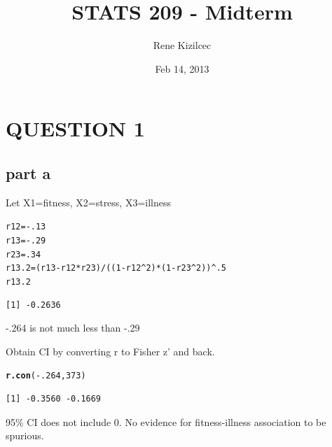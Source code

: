 \documentclass{article}\usepackage{graphicx, color}
\title{STATS 209 - Midterm}
\author{Rene Kizilcec}
\date{Feb 14, 2013}
\makeatletter
\newcommand{\hlfunctioncall}[1]{\textcolor[rgb]{0.501960784313725,0,0.329411764705882}{\textbf{#1}}}%
\newenvironment{kframe}{%
 \def\at@end@of@kframe{}%
 \ifinner\ifhmode%
  \def\at@end@of@kframe{\end{minipage}}%
  \begin{minipage}{\columnwidth}%
 \fi\fi%
 \def\FrameCommand##1{\hskip\@totalleftmargin \hskip-\fboxsep
 \colorbox{shadecolor}{##1}\hskip-\fboxsep
     \hskip-\linewidth \hskip-\@totalleftmargin \hskip\columnwidth}%
 \MakeFramed {\advance\hsize-\width
   \@totalleftmargin\z@ \linewidth\hsize
   \@setminipage}}%
 {\par\unskip\endMakeFramed%
 \at@end@of@kframe}
\newenvironment{knitrout}{}{} %
\makeatother
\begin{document}
\maketitle 







\section*{QUESTION 1}
\subsection*{part a}
Let X1=fitness, X2=stress, X3=illness
\begin{knitrout}
\color{fgcolor}\begin{kframe}
\begin{alltt}
r12=-.13
r13=-.29
r23=.34
r13.2=(r13-r12*r23)/((1-r12^2)*(1-r23^2))^.5
r13.2
\end{alltt}
\begin{verbatim}
[1] -0.2636
\end{verbatim}
\end{kframe}
\end{knitrout}

-.264 is not much less than -.29

Obtain CI by converting r to Fisher z' and back.
\begin{knitrout}
\color{fgcolor}\begin{kframe}
\begin{alltt}
\hlfunctioncall{r.con}(-.264,373) 
\end{alltt}
\begin{verbatim}
[1] -0.3560 -0.1669
\end{verbatim}
\end{kframe}
\end{knitrout}

95\% CI does not include 0. No evidence for fitness-illness association to be spurious.
\end{document}
